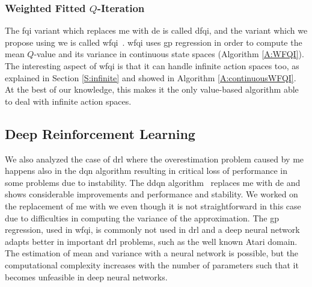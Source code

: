 \subsubsection{Weighted Fitted $Q$-Iteration}
The \gls{fqi} variant which replaces \gls{me} with \gls{de} is called \gls{dfqi}, and the variant which we propose using \gls{we} is called \gls{wfqi}~\cite{deramo2017maximum}. \gls{wfqi} uses \gls{gp} regression in order to compute the mean $Q$-value and its variance in continuous state spaces (Algorithm \ref{A:WFQI}). The interesting aspect of \gls{wfqi} is that it can handle infinite action spaces too, as explained in Section \ref{S:infinite} and showed in Algorithm \ref{A:continuousWFQI}. At the best of our knowledge, this makes it the only value-based algorithm able to deal with infinite action spaces.

\subsection{Deep Reinforcement Learning}
We also analyzed the case of \gls{drl} where the overestimation problem caused by \gls{me} happens also in the \gls{dqn} algorithm resulting in critical loss of performance in some problems due to instability. The \gls{ddqn} algorithm~\cite{hasselt2015double} replaces \gls{me} with \gls{de} and shows considerable improvements and performance and stability. We worked on the replacement of \gls{me} with \gls{we} even though it is not straightforward in this case due to difficulties in computing the variance of the approximation. The \gls{gp} regression, used in \gls{wfqi}, is commonly not used in \gls{drl} and a deep neural network adapts better in important \gls{drl} problems, such as the well known Atari domain. The estimation of mean and variance with a neural network is possible, but the computational complexity increases with the number of parameters such that it becomes unfeasible in deep neural networks.

